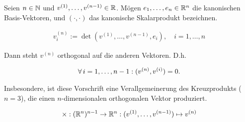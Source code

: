 \begin{theorem*}

Seien $n \in \mathbb{N}$ und $v^{(1)}, \ldots, v^{(n-1)} \in \mathbb{R}$.
Mögen $e_1, \ldots, e_n \in \mathbb{R}^n$ die kanonischen Basis-Vektoren, und $(\cdot, \cdot)$ das kanonische Skalarprodukt bezeichnen.

\begin{align*}
  v^{(n)}_i := \det{(v^{(1)}, \ldots, v^{(n-1)}, e_i)},
  \quad
  i = 1, \ldots, n
\end{align*}

Dann steht $v^{(n)}$ orthogonal auf die anderen Vektoren.
D.h.

\begin{align*}
  \forall \, i = 1, \ldots, n-1:
  (v^{(n)}, v^{(i)}) = 0.
\end{align*}

Insbesondere, ist diese Vorschrift eine Verallgemeinerung des Kreuzprodukts ($n = 3$), die einen $n$-dimensionalen orthogonalen Vektor produziert.

\begin{align*}
  \times:
  (\mathbb{R}^n)^{n-1} \to \mathbb{R}^n:
  (v^{(1)}, \ldots, v^{(n-1)})
  \mapsto
  v^{(n)}
\end{align*}

\end{theorem*}

